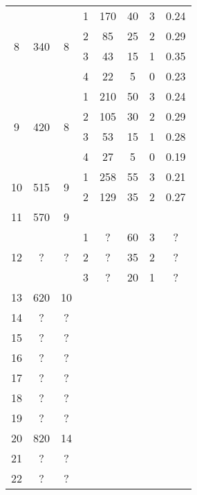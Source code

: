 \begin{longtable}[c]{|c|c|c|c|c|c|c|c|}
    \multirow{4}{*}{8} & \multirow{4}{*}{340} & \multirow{4}{*}{8} & 1 & 170 & 40 & 3 & 0.24 \\\cline{4-8}
    & & & 2 & 85 & 25 & 2 & 0.29 \\\cline{4-8}
    & & & 3 & 43 & 15 & 1 & 0.35 \\\cline{4-8}
    & & & 4 & 22 & 5 & 0 & 0.23 \\\hline
    \multirow{4}{*}{9} & \multirow{4}{*}{420} & \multirow{4}{*}{8} & 1 & 210 & 50 & 3 & 0.24 \\\cline{4-8}
    & & & 2 & 105 & 30 & 2 & 0.29 \\\cline{4-8}
    & & & 3 & 53 & 15 & 1 & 0.28 \\\cline{4-8}
    & & & 4 & 27 & 5 & 0 & 0.19 \\\hline
    \multirow{2}{*}{10} & \multirow{2}{*}{515} & \multirow{2}{*}{9} & 1 & 258 & 55 & 3 & 0.21 \\\cline{4-8}
    & & & 2 & 129 & 35 & 2 & 0.27 \\\hline
    \multirow{1}{*}{11} & \multirow{1}{*}{570} & \multirow{1}{*}{9} & & & & & \\\hline
    \multirow{3}{*}{12} & \multirow{3}{*}{?} & \multirow{3}{*}{?} & 1 & ? & 60 & 3 & ? \\\cline{4-8}
    & & & 2 & ? & 35 & 2 & ? \\\cline{4-8}
    & & & 3 & ? & 20 & 1 & ? \\\hline
    \multirow{1}{*}{13} & \multirow{1}{*}{620} & \multirow{1}{*}{10} & & & & & \\\hline
    \multirow{1}{*}{14} & \multirow{1}{*}{?} & \multirow{1}{*}{?} & & & & & \\\hline
    \multirow{1}{*}{15} & \multirow{1}{*}{?} & \multirow{1}{*}{?} & & & & & \\\hline
    \multirow{1}{*}{16} & \multirow{1}{*}{?} & \multirow{1}{*}{?} & & & & & \\\hline
    \multirow{1}{*}{17} & \multirow{1}{*}{?} & \multirow{1}{*}{?} & & & & & \\\hline
    \multirow{1}{*}{18} & \multirow{1}{*}{?} & \multirow{1}{*}{?} & & & & & \\\hline
    \multirow{1}{*}{19} & \multirow{1}{*}{?} & \multirow{1}{*}{?} & & & & & \\\hline
    \multirow{1}{*}{20} & \multirow{1}{*}{820} & \multirow{1}{*}{14} & & & & & \\\hline
    \multirow{1}{*}{21} & \multirow{1}{*}{?} & \multirow{1}{*}{?} & & & & & \\\hline
    \multirow{1}{*}{22} & \multirow{1}{*}{?} & \multirow{1}{*}{?} & & & & & \\\hline

\end{longtable}
